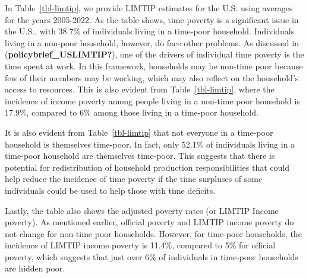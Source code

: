 \documentclass[
  11pt,
]{article}
\begin{document}
In Table~\ref{tbl-limtip}, we provide LIMTIP estimates for the U.S.
using averages for the years 2005-2022. As the table shows, time poverty
is a significant issue in the U.S., with 38.7\% of individuals living in
a time-poor household. Individuals living in a non-poor household,
however, do face other problems. As discussed in
(\textbf{policybrief\_USLIMTIP?}), one of the drivers of individual time
poverty is the time spent at work. In this framework, households may be
non-time poor because few of their members may be working, which may
also reflect on the household's access to resources. This is also
evident from Table~\ref{tbl-limtip}, where the incidence of income
poverty among people living in a non-time poor household is 17.9\%,
compared to 6\% among those living in a time-poor household.

It is also evident from Table~\ref{tbl-limtip} that not everyone in a
time-poor household is themselves time-poor. In fact, only 52.1\% of
individuals living in a time-poor household are themselves time-poor.
This suggests that there is potential for redistribution of household
production responsibilities that could help reduce the incidence of time
poverty if the time surpluses of some individuals could be used to help
those with time deficits.

Lastly, the table also shows the adjusted poverty rates (or LIMTIP
Income poverty). As mentioned earlier, official poverty and LIMTIP
income poverty do not change for non-time poor households. However, for
time-poor households, the incidence of LIMTIP income poverty is 11.4\%,
compared to 5\% for official poverty, which suggests that just over 6\%
of individuals in time-poor households are hidden poor.

\begin{table}[H]

\caption{\label{tbl-limtip}Poverty Rates by Household Time Poverty
Status}


\end{table}%
\end{document}
